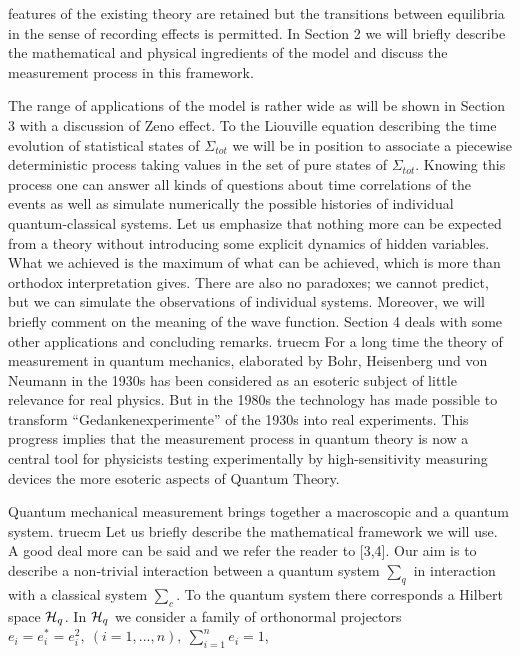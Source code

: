 features of the existing theory are retained but the transitions
between equilibria in the sense of recording effects is permitted.
In Section 2 we will briefly describe the mathematical and physical
ingredients of the model and discuss the measurement process in this
framework.\par
The range of applications of the model is rather wide as will be
shown in Section 3 with a discussion of Zeno effect. To the Liouville
equation describing the time evolution of statistical states of
$\Sigma_{tot}$ we will be in position to associate a piecewise
deterministic process taking values in the set of pure states of
$\Sigma_{tot}$. Knowing this process one can answer all kinds of
questions about time correlations of the events as well as simulate
numerically the possible histories of individual quantum-classical
systems. Let us
emphasize that nothing more can be expected from a theory without
introducing some explicit dynamics of hidden variables. What we
achieved is the maximum of what can be achieved, which is more than
orthodox interpretation gives. There are also no paradoxes; we cannot
predict, but we can simulate the observations of individual systems.
Moreover, we will briefly comment on the meaning of the wave
function. Section 4 deals with some other applications and concluding
remarks.
 truecm
\noindent{}\medskip
For a long time the theory of measurement in quantum mechanics,
elaborated by Bohr, Heisenberg und von Neumann in the 1930s has
been considered as an esoteric subject of little relevance for real
physics. But in the 1980s the technology has made possible to transform
``Gedankenexperimente'' of the 1930s into real experiments. This
progress implies that the measurement process in quantum theory is now
a central tool for physicists testing experimentally by high-sensitivity
measuring devices the more esoteric aspects of Quantum Theory.\par
Quantum mechanical measurement brings together a macroscopic and a
quantum system.
 truecm
\medskip
Let us briefly describe the mathematical framework we will use. A
good deal more can be said and we refer the reader to [3,4]. Our aim
is to describe a non-trivial interaction between a quantum system
$\sum_q$ in interaction with a classical system $\sum_c$.
To the quantum system there corresponds a Hilbert space ${\cal H}_q$.
In ${\cal H}_q$ we consider a family of orthonormal projectors
$e_i = e_i^* = e_i^2,~(i = 1,...,n),~\sum^n_{i=1} e_i = 1$,
